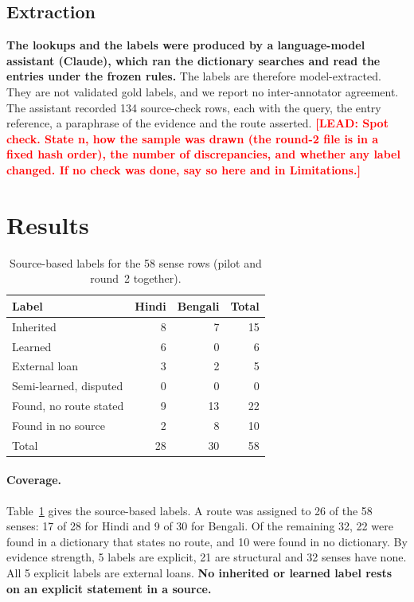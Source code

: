 \documentclass[11pt]{article}
\newcommand{\lead}[1]{\textcolor{red}{\textbf{[LEAD: #1]}}}
\begin{document}
\subsection{Extraction}

\textbf{The lookups and the labels were produced by a language-model assistant (Claude), which ran the dictionary searches and read the entries under the frozen rules.} The labels are therefore model-extracted. They are not validated gold labels, and we report no inter-annotator agreement. The assistant recorded 134 source-check rows, each with the query, the entry reference, a paraphrase of the evidence and the route asserted. \lead{Spot check. State n, how the sample was drawn (the round-2 file is in a fixed hash order), the number of discrepancies, and whether any label changed. If no check was done, say so here and in Limitations.}

\section{Results}

\begin{table}[t]
\centering\small
\begin{tabular}{lrrr}
\toprule
\textbf{Label} & \textbf{Hindi} & \textbf{Bengali} & \textbf{Total} \\
\midrule
Inherited & 8 & 7 & 15 \\
Learned & 6 & 0 & 6 \\
External loan & 3 & 2 & 5 \\
Semi-learned, disputed & 0 & 0 & 0 \\
\midrule
Found, no route stated & 9 & 13 & 22 \\
Found in no source & 2 & 8 & 10 \\
\midrule
Total & 28 & 30 & 58 \\
\bottomrule
\end{tabular}
\caption{Source-based labels for the 58 sense rows (pilot and round~2 together).}
\label{tab:labels}
\end{table}

\paragraph{Coverage.} Table~\ref{tab:labels} gives the source-based labels. A route was assigned to 26 of the 58 senses: 17 of 28 for Hindi and 9 of 30 for Bengali. Of the remaining 32, 22 were found in a dictionary that states no route, and 10 were found in no dictionary. By evidence strength, 5 labels are explicit, 21 are structural and 32 senses have none. All 5 explicit labels are external loans. \textbf{No inherited or learned label rests on an explicit statement in a source.}
\end{document}
